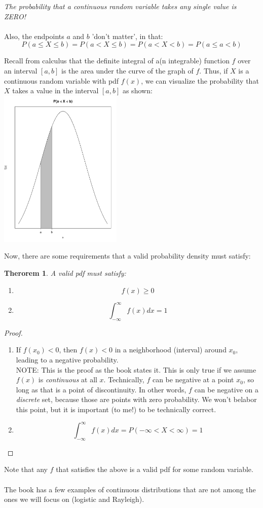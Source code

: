 \documentclass[12pt]{article} %
\newtheorem{thm}{Therorem}
\begin{document}
\emph{The probability that a continuous random variable takes any single value is ZERO!}\\\\
Also, the endpoints $a$ and $b$ 'don't matter', in that:
$$P(a\leq X\leq b) = P(a<X\leq b)= P(a<X<b)= P(a\leq a<b)$$

Recall from calculus that the definite integral of a(n integrable) function $f$ over an interval $[a,b]$ is the area under the curve of the graph of $f$. Thus, if $X$ is a continuous random variable with pdf $f(x)$, we can visualize the probability that $X$ takes a value in the interval $[a,b]$ as shown:\\

\includegraphics[height=3in]{area.pdf}

Now, there are some requirements that a valid probability density must satisfy:\\
\begin{thm}
A valid pdf must satisfy:
\begin{enumerate}
\item $$f(x) \geq 0$$
\item $$\int_{-\infty}^\infty f(x) dx = 1$$
\end{enumerate}
\end{thm}
\begin{proof}
\begin{enumerate}
\item If $f(x_0)<0$, then $f(x)<0$ in a neighborhood (interval) around $x_0$, leading to a negative probability.\\
NOTE: This is the proof as the book states it. This is only true if we assume $f(x)$ is \emph{continuous} at all $x$. Technically, $f$ can be negative at a point $x_0$, so long as that is a point of discontinuity. In other words, $f$ can be negative on a  \emph{discrete} set, because those are points with zero probability.  We won't belabor this point, but it is important (to me!) to be technically correct.
\item $$\int_{-\infty}^{\infty} f(x) dx = P(-\infty<X<\infty) = 1$$
\end{enumerate}
\end{proof}
Note that any $f$ that satisfies the above is a valid pdf for some random variable.\\\\
The book has a few examples of continuous distributions that are not among the ones we will focus on (logistic and Rayleigh). 
\end{document}
